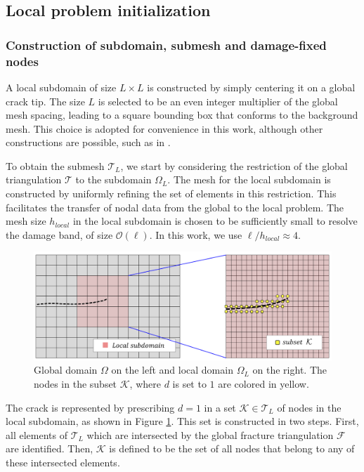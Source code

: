 \subsection{Local problem initialization} 

\subsubsection{Construction of subdomain, submesh and damage-fixed nodes}\label{subdomain_construction}

A local subdomain of size $L\times L$ is constructed by simply centering it on a global crack tip.  The size $L$ is selected to be an even integer multiplier of the global mesh spacing, leading to a square bounding box that conforms to the background mesh.  This choice is adopted for convenience in this work, although other constructions are possible, such as in  \cite{giovanardi2017hybrid}.

To obtain the submesh $\mathcal{T}_L$, we start by considering the restriction of the global triangulation $\mathcal{T}$ to the subdomain $\Omega_L$.  The mesh for the local subdomain is constructed by uniformly refining the set of elements in this restriction. This facilitates the transfer of nodal data from the global to the local problem.  The mesh size $h_{local}$ in the local subdomain is chosen to be sufficiently small to resolve the damage band, of size $\mathcal{O}(\ell)$. In this work, we use  $\ell / h_{local} \approx 4$.

\begin{figure}[h]
    \centering
    \includegraphics[width=\textwidth]{img/Section2/subset_kappa.png}
    \caption{Global domain $\Omega$ on the left and local domain $\Omega_L$ on the right. The nodes in the subset $\mathcal{K}$, where $d$ is set to $1$ are colored in yellow.}
    \label{fig:subset_kappa}
\end{figure} 

The crack is represented by prescribing $d = 1$ in a set $\mathcal{K} \in \mathcal{T}_L$ of nodes in the local subdomain, as shown in Figure \ref{fig:subset_kappa}. This set is constructed in two steps. First, all elements of $\mathcal{T}_L$ which are intersected by the global fracture triangulation $\mathcal{F}$ are identified.  Then, $\mathcal{K}$ is defined to be the set of all nodes that belong to any of these intersected elements.

